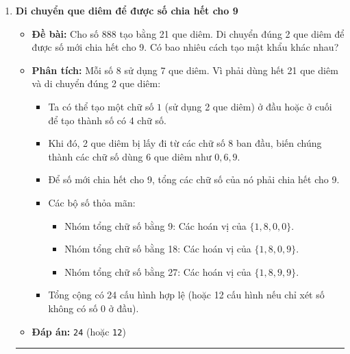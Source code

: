 \documentclass[11pt,a4paper]{article}
\begin{document}
\begin{enumerate}[label=\textbf{Câu \arabic*:}, leftmargin=*]
\hrule
\vspace{0.5cm}

\item \textbf{Di chuyển que diêm để được số chia hết cho 9}
    \begin{itemize}
        \item \textbf{Đề bài:} Cho số $888$ tạo bằng 21 que diêm. Di chuyển đúng 2 que diêm để được số mới chia hết cho 9. Có bao nhiêu cách tạo mật khẩu khác nhau?
        \item \textbf{Phân tích:}
            Mỗi số 8 sử dụng 7 que diêm. Vì phải dùng hết 21 que diêm và di chuyển đúng 2 que diêm:
            \begin{itemize}
                \item Ta có thể tạo một chữ số $1$ (sử dụng 2 que diêm) ở đầu hoặc ở cuối để tạo thành số có 4 chữ số.
                \item Khi đó, 2 que diêm bị lấy đi từ các chữ số 8 ban đầu, biến chúng thành các chữ số dùng 6 que diêm như $0, 6, 9$.
                \item Để số mới chia hết cho 9, tổng các chữ số của nó phải chia hết cho 9.
                \item Các bộ số thỏa mãn:
                    \begin{itemize}
                        \item Nhóm tổng chữ số bằng 9: Các hoán vị của $\{1, 8, 0, 0\}$.
                        \item Nhóm tổng chữ số bằng 18: Các hoán vị của $\{1, 8, 0, 9\}$.
                        \item Nhóm tổng chữ số bằng 27: Các hoán vị của $\{1, 8, 9, 9\}$.
                    \end{itemize}
                \item Tổng cộng có 24 cấu hình hợp lệ (hoặc 12 cấu hình nếu chỉ xét số không có số 0 ở đầu).
            \end{itemize}
        \item \textbf{Đáp án:} \texttt{24} (hoặc \texttt{12})
    \end{itemize}

\hrule
\vspace{0.5cm}


\end{enumerate}
\end{document}
